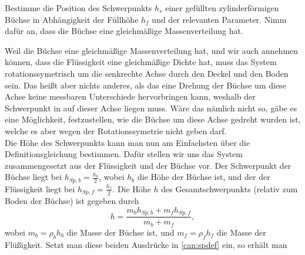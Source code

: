 \begin{minipage}[b]{0.8\textwidth}
\noindent
\begin{Exercise}[label = can, title = {Büchse}, origin = {nach 3. Runde IPhO, 2011},difficulty = 1]
	Bestimme die Position des Schwerpunkts $h_s$ einer gefüllten zylinderförmigen Büchse in Abhängigkeit der Füllhöhe $h_f$ und der relevanten Parameter. Nimm dafür an, dass die Büchse eine gleichmäßige Massenverteilung hat. 
\end{Exercise}
\end{minipage}
\begin{minipage}[b]{0.2\textwidth}
\centering
{}
\end{minipage}
\begin{Answer}[ref = can]
	Weil die Büchse eine gleichmäßige Massenverteilung hat, und wir auch annehmen können, dass die Flüssigkeit eine gleichmäßige Dichte hat, muss das System rotationssymetrisch um die senkrechte Achse durch den Deckel und den Boden sein. Das heißt aber nichts anderes, als das eine Drehung der Büchse um diese Achse keine messbaren Unterschiede hervorbringen kann, weshalb der Schwerpunkt in auf dieser Achse liegen muss. Wäre das nämlich nicht so, gäbe es eine Möglichkeit, festzustellen, wie die Büchse um diese Achse gedreht wurden ist, welche es aber wegen der Rotationssymetrie nicht geben darf.\\
	Die Höhe des Schwerpunkts kann man nun am Einfachsten über die Definitionsgleichung bestimmen. Dafür stellen wir uns das System zusammengesetzt aus der Flüssigkeit und der Büchse vor. Der Schwerpunkt der Büchse liegt bei $h_{Sp,b} = \frac{h_b}{2}$, wobei $h_b$ die Höhe der Büchse ist, und der der Flüssigkeit liegt bei $h_{Sp,f}=\frac{h_f}{2}$. Die Höhe $h$ des Gesamtschwerpunkts (relativ zum Boden der Büchse) ist gegeben durch
	\begin{equation}\label{can:spdef}
		h = \frac{m_{b}h_{Sp,b}+m_{f}h_{Sp,f}}{m_{b}+m_{f}},
	\end{equation}
	wobei $m_b = \rho_b h_b$ die Masse der Büchse ist, und $m_f = \rho_f h_f$ die Masse der Flüßigkeit. Setzt man diese beiden Ausdrücke in \eqref{can:spdef} ein, so erhält man
\end{Answer}
